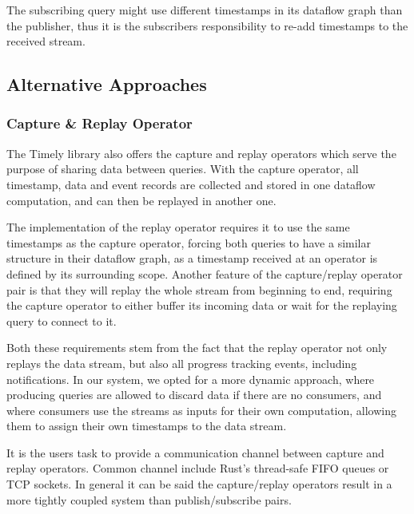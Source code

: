 The subscribing query might use different timestamps in its dataflow graph
than the publisher, thus it is the subscribers responsibility to re-add
timestamps to the received stream. 

\subsection{Alternative Approaches}

\subsubsection{Capture \& Replay Operator}

The Timely library also offers the capture and replay operators which serve the
purpose of sharing data between queries. With the capture operator, all timestamp,
data and event records are collected and stored in one dataflow computation,
and can then be replayed in another one.

The implementation of the replay operator requires it to use the same timestamps
as the capture operator, forcing both queries to have a similar structure
in their dataflow graph, as a timestamp received at an operator is defined
by its surrounding scope. Another feature of the capture/replay operator pair
is that they will replay the whole stream from beginning to end, requiring the
capture operator to either buffer its incoming data or wait for the replaying
query to connect to it. 

Both these requirements stem from the fact that the replay operator not only
replays the data stream, but also all progress tracking events, including
notifications. In our system, we opted for a more dynamic approach, where
producing queries are allowed to discard data if there are no consumers, and
where consumers use the streams as inputs for their own computation,
allowing them to assign their own timestamps to the data stream.

It is the users task to provide a communication channel between capture and 
replay operators. Common channel include Rust's thread-safe FIFO queues or
TCP sockets. In general it can be said the capture/replay operators result
in a more tightly coupled system than publish/subscribe pairs.
